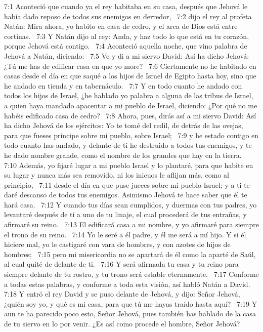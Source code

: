 7:1 Aconteció que cuando ya el rey habitaba en su casa, después que Jehová le había dado reposo de todos sus enemigos en derredor,  
7:2 dijo el rey al profeta Natán: Mira ahora, yo habito en casa de cedro, y el arca de Dios está entre cortinas.  
7:3 Y Natán dijo al rey: Anda, y haz todo lo que está en tu corazón, porque Jehová está contigo.  
7:4 Aconteció aquella noche, que vino palabra de Jehová a Natán, diciendo:  
7:5 Ve y di a mi siervo David: Así ha dicho Jehová: ¿Tú me has de edificar casa en que yo more?  
7:6 Ciertamente no he habitado en casas desde el día en que saqué a los hijos de Israel de Egipto hasta hoy, sino que he andado en tienda y en tabernáculo.  
7:7 Y en todo cuanto he andado con todos los hijos de Israel, ¿he hablado yo palabra a alguna de las tribus de Israel, a quien haya mandado apacentar a mi pueblo de Israel, diciendo: ¿Por qué no me habéis edificado casa de cedro?  
7:8 Ahora, pues, dirás así a mi siervo David: Así ha dicho Jehová de los ejércitos: Yo te tomé del redil, de detrás de las ovejas, para que fueses príncipe sobre mi pueblo, sobre Israel;  
7:9 y he estado contigo en todo cuanto has andado, y delante de ti he destruido a todos tus enemigos, y te he dado nombre grande, como el nombre de los grandes que hay en la tierra.  
7:10 Además, yo fijaré lugar a mi pueblo Israel y lo plantaré, para que habite en su lugar y nunca más sea removido, ni los inicuos le aflijan más, como al principio,  
7:11 desde el día en que puse jueces sobre mi pueblo Israel; y a ti te daré descanso de todos tus enemigos. Asimismo Jehová te hace saber que él te hará casa.  
7:12 Y cuando tus días sean cumplidos, y duermas con tus padres, yo levantaré después de ti a uno de tu linaje, el cual procederá de tus entrañas, y afirmaré su reino.  
7:13 El edificará casa a mi nombre, y yo afirmaré para siempre el trono de su reino.  
7:14 Yo le seré a él padre, y él me será a mí hijo. Y si él hiciere mal, yo le castigaré con vara de hombres, y con azotes de hijos de hombres;  
7:15 pero mi misericordia no se apartará de él como la aparté de Saúl, al cual quité de delante de ti.  
7:16 Y será afirmada tu casa y tu reino para siempre delante de tu rostro, y tu trono será estable eternamente.  
7:17 Conforme a todas estas palabras, y conforme a toda esta visión, así habló Natán a David.  
7:18 Y entró el rey David y se puso delante de Jehová, y dijo: Señor Jehová, ¿quién soy yo, y qué es mi casa, para que tú me hayas traído hasta aquí?  
7:19 Y aun te ha parecido poco esto, Señor Jehová, pues también has hablado de la casa de tu siervo en lo por venir. ¿Es así como procede el hombre, Señor Jehová?  
